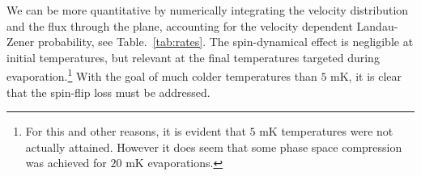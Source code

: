 \documentclass[%
 reprint,
groupedaddress,
 amsmath,amssymb,
 aps,
prl,
]{revtex4-1}
\begin{document}
We can be more quantitative by numerically integrating the velocity distribution and the flux through the plane, accounting for the velocity dependent Landau-Zener probability, see Table.~\ref{tab:rates}. The spin-dynamical effect is negligible at initial temperatures, but relevant at the final temperatures targeted during evaporation.\footnote{For this and other reasons, it is evident that $5\text{ mK}$ temperatures were not actually attained. However it does seem that some phase space compression was achieved for $20\text{ mK}$ evaporations.} With the goal of much colder temperatures than $5\text{ mK}$, it is clear that the spin-flip loss must be addressed. 



\end{document}
